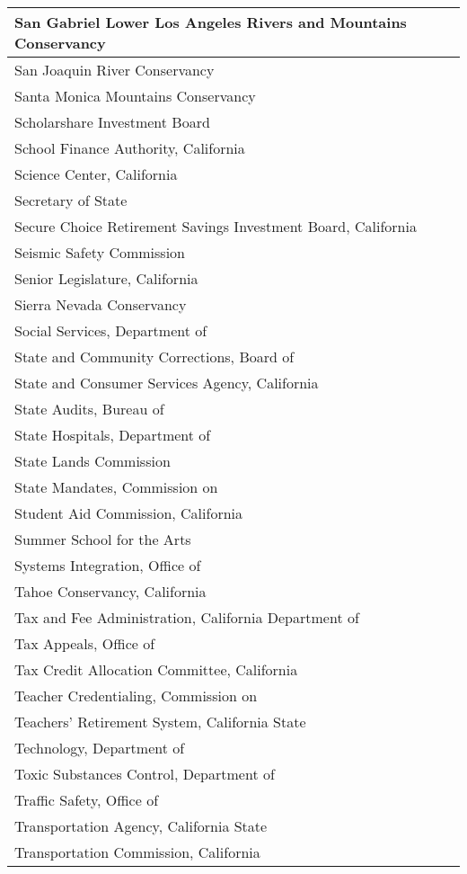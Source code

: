 \documentclass[
]{article}
\begin{document}
\begin{table}
\begin{tabular}[t]{l}
\hline
San Gabriel Lower Los Angeles Rivers and Mountains Conservancy\\
\hline
San Joaquin River Conservancy\\
\hline
Santa Monica Mountains Conservancy\\
\hline
Scholarshare Investment Board\\
\hline
School Finance Authority, California\\
\hline
Science Center, California\\
\hline
Secretary of State\\
\hline
Secure Choice Retirement Savings Investment Board, California\\
\hline
Seismic Safety Commission\\
\hline
Senior Legislature, California\\
\hline
Sierra Nevada Conservancy\\
\hline
Social Services, Department of\\
\hline
State and Community Corrections, Board of\\
\hline
State and Consumer Services Agency, California\\
\hline
State Audits, Bureau of\\
\hline
State Hospitals, Department of\\
\hline
State Lands Commission\\
\hline
State Mandates, Commission on\\
\hline
Student Aid Commission, California\\
\hline
Summer School for the Arts\\
\hline
Systems Integration, Office of\\
\hline
Tahoe Conservancy, California\\
\hline
Tax and Fee Administration, California Department of\\
\hline
Tax Appeals, Office of\\
\hline
Tax Credit Allocation Committee, California\\
\hline
Teacher Credentialing, Commission on\\
\hline
Teachers' Retirement System, California State\\
\hline
Technology, Department of\\
\hline
Toxic Substances Control, Department of\\
\hline
Traffic Safety, Office of\\
\hline
Transportation Agency, California State\\
\hline
Transportation Commission, California\\

\end{tabular}
\end{table}
\end{document}
